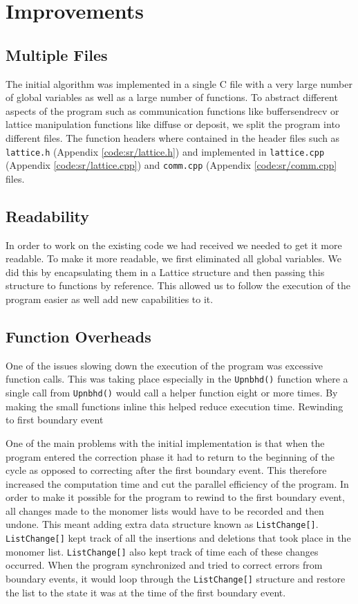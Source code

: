 \section{Improvements}

\subsection{Multiple Files}
The initial algorithm was implemented in a single C file with a very large number of global variables as well as a large number of functions. To abstract different aspects of the program such as communication functions like buffersendrecv or lattice manipulation functions like diffuse or deposit, we split the program into different files. The function headers where contained in the header files such as \texttt{lattice.h} (Appendix \ref{code:sr/lattice.h}) and implemented in \texttt{lattice.cpp} (Appendix \ref{code:sr/lattice.cpp}) and \texttt{comm.cpp} (Appendix \ref{code:sr/comm.cpp} files.

\subsection{Readability}
In order to work on the existing code we had received we needed to get it more readable. To make it more readable, we first eliminated all global variables. We did this by encapsulating them in a Lattice structure and then passing this structure to functions by reference. This allowed us to follow the execution of the program easier as well add new capabilities to it.

\subsection{Function Overheads}
One of the issues slowing down the execution of the program was excessive function calls. This was taking place especially in the \texttt{Upnbhd()} function where a single call from \texttt{Upnbhd()} would call a helper function eight or more times. By making the small functions inline this helped reduce execution time.
Rewinding to first boundary event

One of the main problems with the initial implementation is that when the program entered the correction phase it had to return to the beginning of the cycle as opposed to correcting after the first boundary event. This therefore increased the computation time and cut the parallel efficiency of the program.
In order to make it possible for the program to rewind to the first boundary event, all changes made to the monomer lists would have to be recorded and then undone. This meant adding extra data structure known as \texttt{ListChange[]}. \texttt{ListChange[]}  kept track of all the insertions and deletions that took place in the monomer list. \texttt{ListChange[]} also kept track of time each of these changes occurred. When the program synchronized and tried to  correct errors from boundary events, it would loop through the \texttt{ListChange[]} structure and restore the list to the state it was at the time of the first boundary event.

